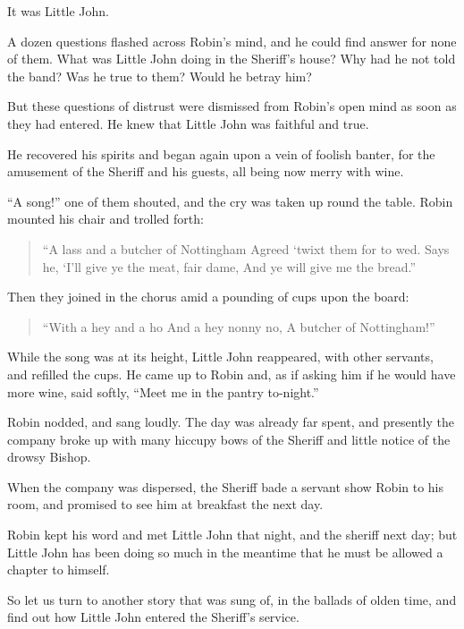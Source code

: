 It was Little John.

A dozen questions flashed across Robin's mind, and he could find answer
for none of them. What was Little John doing in the Sheriff's house? Why
had he not told the band? Was he true to them? Would he betray him?

But these questions of distrust were dismissed from Robin's open mind as
soon as they had entered. He knew that Little John was faithful and
true.

He recovered his spirits and began again upon a vein of foolish banter,
for the amusement of the Sheriff and his guests, all being now merry
with wine.

``A song!'' one of them shouted, and the cry was taken up round the
table. Robin mounted his chair and trolled forth:

\begin{quote}
“A lass and a butcher of Nottingham
Agreed ‘twixt them for to wed.
Says he, ‘I’ll give ye the meat, fair dame,
And ye will give me the bread.”
\end{quote}

Then they joined in the chorus amid a pounding of cups upon the board:

\begin{quote}
“With a hey and a ho
And a hey nonny no,
A butcher of Nottingham!”
\end{quote}

While the song was at its height, Little John reappeared, with other
servants, and refilled the cups. He came up to Robin and, as if asking
him if he would have more wine, said softly, ``Meet me in the pantry
to-night.''

Robin nodded, and sang loudly. The day was already far spent, and
presently the company broke up with many hiccupy bows of the Sheriff and
little notice of the drowsy Bishop.

When the company was dispersed, the Sheriff bade a servant show Robin to
his room, and promised to see him at breakfast the next day.

Robin kept his word and met Little John that night, and the sheriff next
day; but Little John has been doing so much in the meantime that he must
be allowed a chapter to himself.

So let us turn to another story that was sung of, in the ballads of
olden time, and find out how Little John entered the Sheriff's service.
